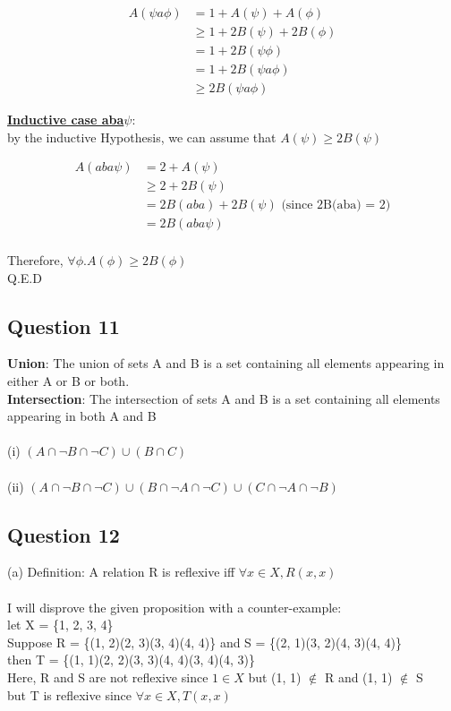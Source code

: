 \documentclass[11pt]{article}
\begin{document}
{{{\begin{align*}
    A(\psi a \phi) &= 1 + A(\psi) + A(\phi) \\
    &\geq 1 + 2B(\psi) + 2B(\phi) \\
    &= 1 + 2B(\psi \phi) \\
    &= 1 + 2B(\psi a \phi) \\
    &\geq 2B(\psi a \phi)
\end{align*}

\noindent
\underline{\textbf{Inductive case aba$\psi$}}: \\
by the inductive Hypothesis, we can assume that
$A(\psi) \geq 2B(\psi)$

\begin{align*}
    A(aba \psi) &= 2 + A(\psi) \\
    &\geq 2 + 2B(\psi) \\
    &= 2B(aba) + 2B(\psi) \text{ (since 2B(aba) = 2)} \\
    &= 2B(aba\psi)
\end{align*}
\\
Therefore, $\forall \phi . A(\phi) \geq 2B(\phi)$\\
Q.E.D
\subsection*{Question 11}
\textbf{Union}: The union of sets A and B is a set containing all elements appearing in either A or B or both.\\
\textbf{Intersection}: The intersection of sets A and B is a set containing all elements appearing in both A and B\\
\\
(i) $(A \cap \neg B \cap \neg C) \cup (B \cap C)$ \\ \\
(ii) $(A \cap \neg B \cap \neg C) \cup (B \cap \neg A \cap \neg C) \cup (C \cap \neg A \cap \neg B)$

\subsection*{Question 12}
(a) Definition: A relation R is reflexive iff $\forall x \in X, R(x, x)$ \\ \\
%
I will disprove the given proposition with a counter-example: \\
let X = \{1, 2, 3, 4\} \\
Suppose R = \{(1, 2)(2, 3)(3, 4)(4, 4)\} and S = \{(2, 1)(3, 2)(4, 3)(4, 4)\} \\
then T = \{(1, 1)(2, 2)(3, 3)(4, 4)(3, 4)(4, 3)\} \\
Here, R and S are not reflexive since $1 \in X$ but (1, 1) $\notin$ R and (1, 1) $\notin$ S \\
but T is reflexive since $\forall x \in X, T(x, x)$

}}}
\end{document}
